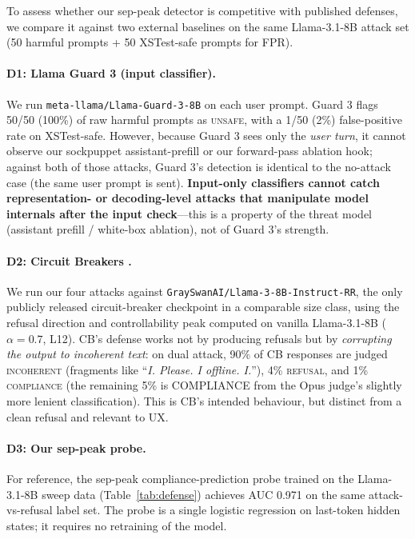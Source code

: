 \documentclass{article}
\begin{document}
To assess whether our sep-peak detector is competitive with published defenses, we compare it against two external baselines on the same Llama-3.1-8B attack set (50 harmful prompts + 50 XSTest-safe prompts for FPR).

\paragraph{D1: Llama Guard 3 (input classifier).} We run \texttt{meta-llama/Llama-Guard-3-8B} \citep{llamaguard3} on each user prompt. Guard 3 flags 50/50 (100\%) of raw harmful prompts as \textsc{unsafe}, with a 1/50 (2\%) false-positive rate on XSTest-safe. However, because Guard 3 sees only the \emph{user turn}, it cannot observe our sockpuppet assistant-prefill or our forward-pass ablation hook; against both of those attacks, Guard 3's detection is identical to the no-attack case (the same user prompt is sent). \textbf{Input-only classifiers cannot catch representation- or decoding-level attacks that manipulate model internals after the input check}---this is a property of the threat model (assistant prefill / white-box ablation), not of Guard 3's strength.

\paragraph{D2: Circuit Breakers \citep{zou2024circuit}.} We run our four attacks against \texttt{GraySwanAI/Llama-3-8B-Instruct-RR}, the only publicly released circuit-breaker checkpoint in a comparable size class, using the refusal direction and controllability peak computed on vanilla Llama-3.1-8B ($\alpha=0.7$, L12). CB's defense works not by producing refusals but by \emph{corrupting the output to incoherent text}: on dual attack, 90\% of CB responses are judged \textsc{incoherent} (fragments like ``\textit{I. Please. I offline. I.}''), 4\% \textsc{refusal}, and 1\% \textsc{compliance} (the remaining 5\% is COMPLIANCE from the Opus judge's slightly more lenient classification). This is CB's intended behaviour, but distinct from a clean refusal and relevant to UX.

\paragraph{D3: Our sep-peak probe.} For reference, the sep-peak compliance-prediction probe trained on the Llama-3.1-8B sweep data (Table~\ref{tab:defense}) achieves AUC 0.971 on the same attack-vs-refusal label set. The probe is a single logistic regression on last-token hidden states; it requires no retraining of the model.
\end{document}
